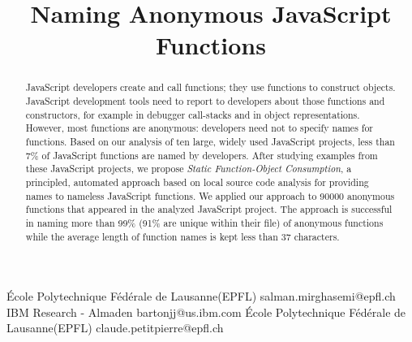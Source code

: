 \documentclass[10pt, preprint]{sigplanconf}
\begin{document}
\copyrightdata{[to be supplied]} 


\title{Naming Anonymous JavaScript Functions}

           {\'Ecole Polytechnique F\'ed\'erale de Lausanne(EPFL)}
           {salman.mirghasemi@epfl.ch}
           {IBM Research - Almaden}
           {bartonjj@us.ibm.com} 
           {\'Ecole Polytechnique F\'ed\'erale de Lausanne(EPFL)}
           {claude.petitpierre@epfl.ch}

\maketitle

\begin{abstract}
JavaScript developers create and call functions; they use functions to construct objects. JavaScript development tools need to report to developers about those functions and constructors, for example in debugger call-stacks and in object representations. However, most functions are anonymous: developers need not to specify names for functions.  
 Based on our analysis of ten large, widely used JavaScript projects, less than 7\% of JavaScript functions are named by developers. 
After studying examples from these JavaScript projects, we propose \textit{Static Function-Object Consumption}, a principled, automated approach based on local source code analysis for providing names to nameless JavaScript functions. We applied our approach to 90000 anonymous functions that appeared in the analyzed JavaScript project. The approach is successful in naming more than 99\% (91\% are unique within their file) of anonymous functions while the average length of function names is kept less than 37 characters.%

\end{abstract}

\end{document}
